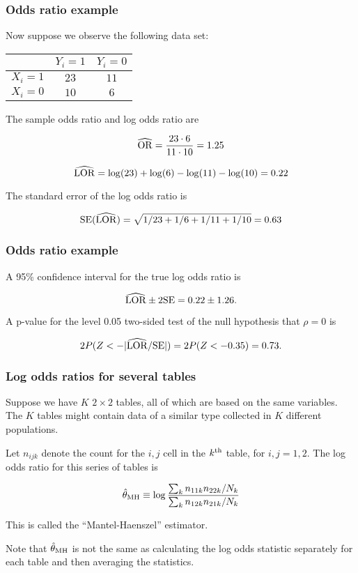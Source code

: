 \documentclass{beamer}
\begin{document}
\begin{frame}
\frametitle{Odds ratio example}

Now suppose we observe the following data set:

\begin{center}
\begin{tabular}{lcc}
        & $Y_i=1$ & $Y_i=0$\\\hline
$X_i=1$ & $23$ & $11$\\ 
$X_i=0$ & $10$ & $6$\\\hline
\end{tabular}
\end{center}

The sample odds ratio and log odds ratio are

$$ \widehat{\rm OR} = \frac{23\cdot 6}{11\cdot 10} =
1.25
$$

$$\widehat{\rm LOR} = \log(23) + \log(6) - \log(11) - \log(10) = 0.22
$$

The standard error of the log odds ratio is

$$
{\rm SE}(\widehat{\rm LOR}) = \sqrt{1/23 + 1/6 + 1/11 + 1/10} = 0.63
$$

\end{frame}


\begin{frame}
\frametitle{Odds ratio example}

A 95\% confidence interval for the true log odds ratio is

$$
\widehat{\rm LOR} \pm 2{\rm SE} = 0.22 \pm 1.26.
$$

A p-value for the level 0.05 two-sided test of the null hypothesis
that $\rho=0$ is

$$
2P(Z < -|\widehat{\rm LOR}/{\rm SE}|) = 2P(Z < -0.35) = 0.73.
$$

\end{frame}


\begin{frame}
\frametitle{Log odds ratios for several tables}

Suppose we have $K$ $2\times 2$ tables, all of which are based on the
same variables.  The $K$ tables might contain data of a similar type
collected in $K$ different populations.

Let $n_{ijk}$ denote the count for the $i,j$ cell in the $k^{\rm th}$
table, for $i,j=1,2$.  The log odds ratio for this series of tables is

$$ \hat{\theta}_{\rm MH} \equiv \log\frac{\sum_k
n_{11k}n_{22k}/N_k}{\sum_k n_{12k}n_{21k}/N_k}
$$

This is called the ``Mantel-Haenszel'' estimator.

Note that $\hat{\theta}_{\rm MH}$ is not the same as calculating the
log odds statistic separately for each table and then averaging the
statistics.

\end{frame}
\end{document}
